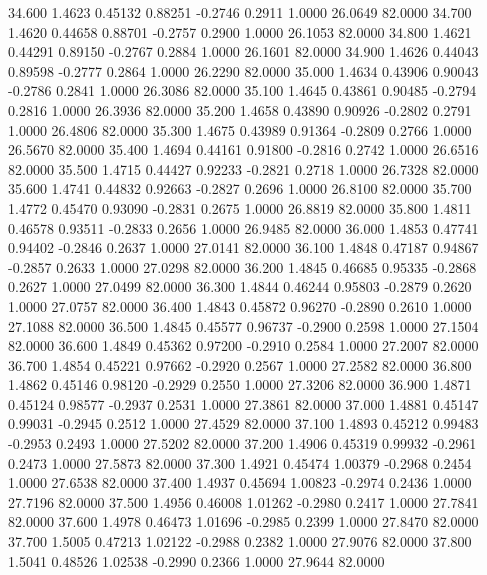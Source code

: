   34.600   1.4623   0.45132   0.88251  -0.2746   0.2911   1.0000  26.0649  82.0000
  34.700   1.4620   0.44658   0.88701  -0.2757   0.2900   1.0000  26.1053  82.0000
  34.800   1.4621   0.44291   0.89150  -0.2767   0.2884   1.0000  26.1601  82.0000
  34.900   1.4626   0.44043   0.89598  -0.2777   0.2864   1.0000  26.2290  82.0000
  35.000   1.4634   0.43906   0.90043  -0.2786   0.2841   1.0000  26.3086  82.0000
  35.100   1.4645   0.43861   0.90485  -0.2794   0.2816   1.0000  26.3936  82.0000
  35.200   1.4658   0.43890   0.90926  -0.2802   0.2791   1.0000  26.4806  82.0000
  35.300   1.4675   0.43989   0.91364  -0.2809   0.2766   1.0000  26.5670  82.0000
  35.400   1.4694   0.44161   0.91800  -0.2816   0.2742   1.0000  26.6516  82.0000
  35.500   1.4715   0.44427   0.92233  -0.2821   0.2718   1.0000  26.7328  82.0000
  35.600   1.4741   0.44832   0.92663  -0.2827   0.2696   1.0000  26.8100  82.0000
  35.700   1.4772   0.45470   0.93090  -0.2831   0.2675   1.0000  26.8819  82.0000
  35.800   1.4811   0.46578   0.93511  -0.2833   0.2656   1.0000  26.9485  82.0000
  36.000   1.4853   0.47741   0.94402  -0.2846   0.2637   1.0000  27.0141  82.0000
  36.100   1.4848   0.47187   0.94867  -0.2857   0.2633   1.0000  27.0298  82.0000
  36.200   1.4845   0.46685   0.95335  -0.2868   0.2627   1.0000  27.0499  82.0000
  36.300   1.4844   0.46244   0.95803  -0.2879   0.2620   1.0000  27.0757  82.0000
  36.400   1.4843   0.45872   0.96270  -0.2890   0.2610   1.0000  27.1088  82.0000
  36.500   1.4845   0.45577   0.96737  -0.2900   0.2598   1.0000  27.1504  82.0000
  36.600   1.4849   0.45362   0.97200  -0.2910   0.2584   1.0000  27.2007  82.0000
  36.700   1.4854   0.45221   0.97662  -0.2920   0.2567   1.0000  27.2582  82.0000
  36.800   1.4862   0.45146   0.98120  -0.2929   0.2550   1.0000  27.3206  82.0000
  36.900   1.4871   0.45124   0.98577  -0.2937   0.2531   1.0000  27.3861  82.0000
  37.000   1.4881   0.45147   0.99031  -0.2945   0.2512   1.0000  27.4529  82.0000
  37.100   1.4893   0.45212   0.99483  -0.2953   0.2493   1.0000  27.5202  82.0000
  37.200   1.4906   0.45319   0.99932  -0.2961   0.2473   1.0000  27.5873  82.0000
  37.300   1.4921   0.45474   1.00379  -0.2968   0.2454   1.0000  27.6538  82.0000
  37.400   1.4937   0.45694   1.00823  -0.2974   0.2436   1.0000  27.7196  82.0000
  37.500   1.4956   0.46008   1.01262  -0.2980   0.2417   1.0000  27.7841  82.0000
  37.600   1.4978   0.46473   1.01696  -0.2985   0.2399   1.0000  27.8470  82.0000
  37.700   1.5005   0.47213   1.02122  -0.2988   0.2382   1.0000  27.9076  82.0000
  37.800   1.5041   0.48526   1.02538  -0.2990   0.2366   1.0000  27.9644  82.0000
